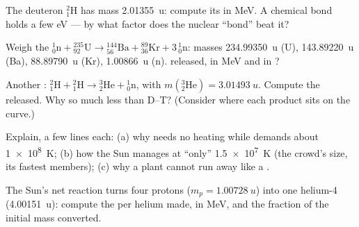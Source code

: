 \begin{exercise}[$\star\star$]\label{exo:g12:nuclear-energy:6}
The deuteron ${}^{2}_{1}\mathrm{H}$ has mass \qty{2.01355}{u}: compute its
 in \unit{MeV}. A chemical bond holds a few \unit{eV} --- by
what factor does the nuclear ``bond'' beat it?
\end{exercise}

\begin{exercise}[$\star\star$]\label{exo:g12:nuclear-energy:7}
Weigh the  ${}^{1}_{0}\mathrm{n} + {}^{235}_{92}\mathrm{U} \to
{}^{144}_{56}\mathrm{Ba} + {}^{89}_{36}\mathrm{Kr} + 3\,{}^{1}_{0}\mathrm{n}$:
masses \qty{234.99350}{u} (U), \qty{143.89220}{u} (Ba), \qty{88.89790}{u}
(Kr), \qty{1.00866}{u} (n).  released, in \unit{MeV} and in ?
\end{exercise}

\begin{exercise}[$\star\star$]\label{exo:g12:nuclear-energy:8}
Another : ${}^{2}_{1}\mathrm{H} + {}^{2}_{1}\mathrm{H} \to
{}^{3}_{2}\mathrm{He} + {}^{1}_{0}\mathrm{n}$, with
$m({}^{3}_{2}\mathrm{He}) = \qty{3.01493}{u}$. Compute the  released.
Why so much less than D--T? (Consider where each product sits on the curve.)
\end{exercise}

\begin{exercise}[$\star\star$]\label{exo:g12:nuclear-energy:9}
Explain, a few lines each: (a) why  needs no heating while 
demands about \qty{1e8}{K}; (b) how the Sun manages at ``only'' \qty{1.5e7}{K}
(the crowd's size, its fastest members); (c) why a  plant cannot run
away like a .
\end{exercise}

\begin{exercise}[$\star\star$]\label{exo:g12:nuclear-energy:10}
The Sun's net reaction turns four protons ($m_p = \qty{1.00728}{u}$) into one
helium-4  (\qty{4.00151}{u}): compute the  per helium made, in
\unit{MeV}, and the fraction of the initial mass converted.
\end{exercise}

